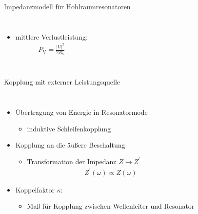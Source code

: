 \documentclass[12pt,xcolor=dvipsnames,professionalfonts]{beamer}
\begin{document}
\begin{frame}{Impedanzmodell für Hohlraumresonatoren}
\begin{columns}[T]
		\begin{itemize}
			\item mittlere Verlustleistung:
			\begin{align*}
				P_\mathrm{V} = \frac{\left|U\right|^2}{2 R_\mathrm{S}}
			\end{align*}
		\end{itemize}
	\end{columns}
	

\end{frame}

\begin{frame}{Kopplung mit externer Leistungsquelle}
	\begin{columns}[c]
		\begin{itemize}
			\setlength\itemsep{1.25em}
			\item Übertragung von Energie in Resonatormode
			\begin{itemize}
				\setlength\itemsep{0.25em}
				\item induktive Schleifenkopplung
			\end{itemize}
			
			\item Kopplung an die äußere Beschaltung
			\begin{itemize}
				\setlength\itemsep{0.25em}
				\item Transformation der Impedanz $Z \rightarrow Z^\prime$
				\begin{align*}
					Z^\prime(\omega) \propto Z(\omega)
				\end{align*}
			\end{itemize}
			
			\item Koppelfaktor $\kappa$:
			\begin{itemize}
				\setlength\itemsep{0.25em}
				\item Maß für Kopplung zwischen Wellenleiter und Resonator\setlength\itemsep{0.25em}
			\end{itemize}
		\end{itemize}
		

\end{columns}
\end{frame}
\end{document}
